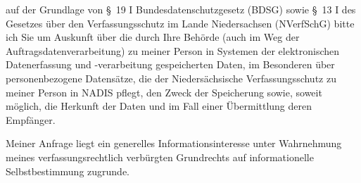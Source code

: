 auf der Grundlage von §~19 I Bundesdatenschutzgesetz (BDSG) sowie
§~13 I des Gesetzes über den Verfassungsschutz im Lande Niedersachsen (NVerfSchG)
bitte ich Sie um Auskunft über die durch Ihre Behörde (auch im Weg der Auftragsdatenverarbeitung)
zu meiner Person in Systemen der elektronischen Datenerfassung und -verarbeitung
gespeicherten Daten, im Besonderen über personenbezogene Datensätze, die der
Niedersächsische Verfassungsschutz zu meiner Person in NADIS pflegt, den Zweck der
Speicherung sowie, soweit möglich, die Herkunft der Daten und im Fall einer
Übermittlung deren Empfänger.

Meiner Anfrage liegt ein generelles Informationsinteresse unter Wahrnehmung
meines verfassungsrechtlich verbürgten Grundrechts auf informationelle
Selbstbestimmung zugrunde.
